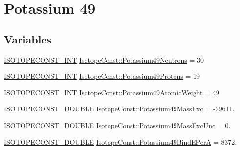 \hypertarget{group___isotope_const-_potassium-_k49}{}\section{Potassium 49}
\label{group___isotope_const-_potassium-_k49}
\subsection*{Variables}
\begin{DoxyCompactItemize}
\item 
\mbox{\hyperlink{group___isotope_const-_macros_ga5f18360b3e99483a35c32d789e62621c}{I\+S\+O\+T\+O\+P\+E\+C\+O\+N\+S\+T\+\_\+\+I\+NT}} \mbox{\hyperlink{group___isotope_const-_potassium-_k49_ga892b5feb764d412e8d117c4fa4f42cda}{Isotope\+Const\+::\+Potassium49\+Neutrons}} = 30
\item 
\mbox{\hyperlink{group___isotope_const-_macros_ga5f18360b3e99483a35c32d789e62621c}{I\+S\+O\+T\+O\+P\+E\+C\+O\+N\+S\+T\+\_\+\+I\+NT}} \mbox{\hyperlink{group___isotope_const-_potassium-_k49_ga3a7f8f7cb39e270ca8a2470b3372c9c8}{Isotope\+Const\+::\+Potassium49\+Protons}} = 19
\item 
\mbox{\hyperlink{group___isotope_const-_macros_ga5f18360b3e99483a35c32d789e62621c}{I\+S\+O\+T\+O\+P\+E\+C\+O\+N\+S\+T\+\_\+\+I\+NT}} \mbox{\hyperlink{group___isotope_const-_potassium-_k49_ga827ba389a0e105abcfdfb1c98f5f6232}{Isotope\+Const\+::\+Potassium49\+Atomic\+Weight}} = 49
\item 
\mbox{\hyperlink{group___isotope_const-_macros_ga8f45a7272ce02c0b4c65c44636ed719a}{I\+S\+O\+T\+O\+P\+E\+C\+O\+N\+S\+T\+\_\+\+D\+O\+U\+B\+LE}} \mbox{\hyperlink{group___isotope_const-_potassium-_k49_ga6190601a23748424117051e4f30b97bc}{Isotope\+Const\+::\+Potassium49\+Mass\+Exc}} = -\/29611.
\item 
\mbox{\hyperlink{group___isotope_const-_macros_ga8f45a7272ce02c0b4c65c44636ed719a}{I\+S\+O\+T\+O\+P\+E\+C\+O\+N\+S\+T\+\_\+\+D\+O\+U\+B\+LE}} \mbox{\hyperlink{group___isotope_const-_potassium-_k49_ga249cbb0e4e3b15445a944a6ccc1e40e2}{Isotope\+Const\+::\+Potassium49\+Mass\+Exc\+Unc}} = 0.
\item 
\mbox{\hyperlink{group___isotope_const-_macros_ga8f45a7272ce02c0b4c65c44636ed719a}{I\+S\+O\+T\+O\+P\+E\+C\+O\+N\+S\+T\+\_\+\+D\+O\+U\+B\+LE}} \mbox{\hyperlink{group___isotope_const-_potassium-_k49_ga6f46d54396fc95dcbdb14816a830c299}{Isotope\+Const\+::\+Potassium49\+Bind\+E\+PerA}} = 8372.
\item 

\end{DoxyCompactItemize}
